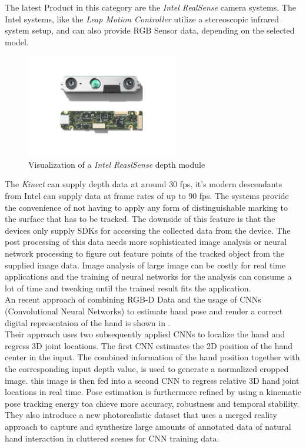 The latest Product in this category are the \textit{Intel RealSense} camera systems\cite{IntelCorporation.2018}. The Intel systems, like the\textit{ Leap Motion Controller} utilize a stereoscopic infrared system setup, and can also provide RGB Sensor data, depending on the selected model.
\begin{figure}[H]
\centering
\includegraphics[width=0.6\textwidth]{images/RealSense.png}
\caption{Visualization of a \textit{Intel ReaslSense} depth module\cite{IntelCorporation.2018}}
\label{img:leapMotion} 
\end{figure}
The \textit{Kinect} can supply depth data at around 30 fps, it's modern  descendants from Intel can supply data at frame rates of up to 90 fps. The systems provide the convenience of not having to apply any form of distinguishable marking to the surface that has to be tracked. The downside of this feature is that the devices only supply SDKs for accessing the collected data from the device. The post processing of this data needs more sophisticated image analysis or neural network processing to figure out feature points of the tracked object from the supplied image data\cite{JamieShotton.2011,Oikonomidis.2011b}. Image analysis of large image can be costly for real time applications and the training of neural networks for the analysis can consume a lot of time and tweaking until the trained result fits the application.
\\An recent approach of combining RGB-D Data and the usage of CNNs (Convolutional Neural Networks) to estimate hand pose and render a correct digital representaion of the hand is shown in \cite{FranziskaMueller.2017}.
\\Their approach uses two subsequently applied CNNs to localize the hand and regress 3D joint locations. The first CNN estimates the 2D position of the hand center in the input. The combined information of the hand position together with the corresponding input depth value, is used to generate a normalized cropped image. this image is then fed into a second CNN to regress relative 3D hand joint
locations in real time. Pose estimation is furthermore refined by using a kinematic pose tracking energy toa chieve more accuracy, robustness and
temporal stability.
\\They also introduce a new photorealistic dataset that uses a merged reality
approach to capture and synthesize large amounts of annotated
data of natural hand interaction in cluttered scenes for CNN training data.






